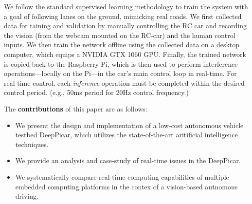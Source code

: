 We follow the standard supervised learning methodology to train the
system with a goal of following lanes on the ground, mimicking real
roads. We first collected data for taining and validation by manually 
controlling the RC car and recording the vision (from the webcam
mounted on the RC-car) and the human control inputs. We then train the
network offline using the collected data on a desktop computer, which
equips a NVIDIA GTX 1060 GPU. Finally, the trained network is copied
back to the Raspberry Pi, which is then used to perform interference
operations---locally on the Pi---in the car's main control loop in
real-time. For real-time control, each \emph{inference} operation must
be completed within the desired control period. (e.g., 50ms period for
20Hz control frequency.)


The {\bf contributions} of this paper are as follows:
\begin{itemize}
  \item We present the design and implementation of a
    low-cost autonomous vehicle testbed DeepPicar, which utilizes the
    state-of-the-art aritificial intelligence techniques.
  \item We provide an analysis and case-study of real-time issues in the
    DeepPicar.
  \item We systematically compare real-time computing capabilities of
    multiple embedded computing platforms in the contex of a
    vision-based autnomous driving.
\end{itemize}



